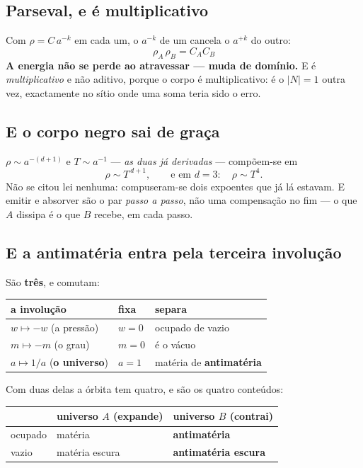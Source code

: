 \documentclass[11pt,a4paper]{article}
\begin{document}
\subsection*{Parseval, e é multiplicativo}

Com $\rho=C\,a^{-k}$ em cada um, o $a^{-k}$ de um cancela o $a^{+k}$ do outro:
\[
  \boxed{\;\rho_A\,\rho_B = C_A C_B\;}
\]
\textbf{A energia não se perde ao atravessar --- muda de domínio.} E é \emph{multiplicativo} e não
aditivo, porque o corpo é multiplicativo: é o $|N|=1$ outra vez, exactamente no sítio onde uma soma
teria sido o erro.

\subsection*{E o corpo negro sai de graça}

$\rho\sim a^{-(d+1)}$ e $T\sim a^{-1}$ --- \emph{as duas já derivadas} --- compõem-se em
\[
  \rho \sim T^{\,d+1}, \qquad\text{e em } d=3: \quad \rho\sim T^4 .
\]
Não se citou lei nenhuma: compuseram-se dois expoentes que já lá estavam. E emitir e absorver são o
par \emph{passo a passo}, não uma compensação no fim --- o que $A$ dissipa é o que $B$ recebe, em
cada passo.

\subsection*{E a antimatéria entra pela terceira involução}

São \textbf{três}, e comutam:

\begin{center}\small
\begin{tabular}{@{}lll@{}}
\toprule
a involução & fixa & separa \\
\midrule
$w\mapsto-w$ (a pressão) & $w=0$ & ocupado de vazio \\
$m\mapsto-m$ (o grau) & $m=0$ & é o vácuo \\
$a\mapsto1/a$ (\textbf{o universo}) & $a=1$ & matéria de \textbf{antimatéria} \\
\bottomrule
\end{tabular}
\end{center}

\noindent Com duas delas a órbita tem quatro, e são os quatro conteúdos:

\begin{center}\small
\begin{tabular}{@{}lll@{}}
\toprule
 & universo $A$ (expande) & universo $B$ (contrai) \\
\midrule
ocupado & matéria & \textbf{antimatéria} \\
vazio & matéria escura & \textbf{antimatéria escura} \\
\bottomrule
\end{tabular}
\end{center}
\end{document}
